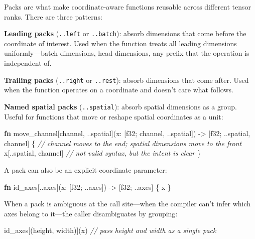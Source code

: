 \documentclass[11pt,]{article}
\newenvironment{Shaded}{}{}
\newcommand{\CommentTok}[1]{\textcolor[rgb]{0.38,0.63,0.69}{\textit{#1}}}
\newcommand{\DataTypeTok}[1]{\textcolor[rgb]{0.56,0.13,0.00}{#1}}
\newcommand{\KeywordTok}[1]{\textcolor[rgb]{0.00,0.44,0.13}{\textbf{#1}}}
\newcommand{\NormalTok}[1]{#1}
\newcommand{\OperatorTok}[1]{\textcolor[rgb]{0.40,0.40,0.40}{#1}}
\begin{document}
Packs are what make coordinate-aware functions reusable across different
tensor ranks. There are three patterns:

\textbf{Leading packs} (\texttt{..left} or \texttt{..batch}): absorb
dimensions that come before the coordinate of interest. Used when the
function treats all leading dimensions uniformly---batch dimensions,
head dimensions, any prefix that the operation is independent of.

\textbf{Trailing packs} (\texttt{..right} or \texttt{..rest}): absorb
dimensions that come after. Used when the function operates on a
coordinate and doesn't care what follows.

\textbf{Named spatial packs} (\texttt{..spatial}): absorb spatial
dimensions as a group. Useful for functions that move or reshape spatial
coordinates as a unit:

\begin{Shaded}
\begin{Highlighting}[]
\KeywordTok{fn}\NormalTok{ move_channel[channel, ..spatial](x: }\OperatorTok{[}\DataTypeTok{f32}\NormalTok{; channel, ..spatial}\OperatorTok{]}\NormalTok{)}
\NormalTok{    -> }\OperatorTok{[}\DataTypeTok{f32}\NormalTok{; ..spatial, channel}\OperatorTok{]}
\OperatorTok{\{}
    \CommentTok{// channel moves to the end; spatial dimensions move to the front}
\NormalTok{    x}\OperatorTok{[}\NormalTok{..spatial, channel}\OperatorTok{]}   \CommentTok{// not valid syntax, but the intent is clear}
\OperatorTok{\}}
\end{Highlighting}
\end{Shaded}

A pack can also be an explicit coordinate parameter:

\begin{Shaded}
\begin{Highlighting}[]
\KeywordTok{fn}\NormalTok{ id_axes[..axes](x: }\OperatorTok{[}\DataTypeTok{f32}\NormalTok{; ..axes}\OperatorTok{]}\NormalTok{) -> }\OperatorTok{[}\DataTypeTok{f32}\NormalTok{; ..axes}\OperatorTok{]} \OperatorTok{\{}
\NormalTok{    x}
\OperatorTok{\}}
\end{Highlighting}
\end{Shaded}

When a pack is ambiguous at the call site---when the compiler can't
infer which axes belong to it---the caller disambiguates by grouping:

\begin{Shaded}
\begin{Highlighting}[]
\NormalTok{id_axes}\OperatorTok{[}\NormalTok{(height, width)}\OperatorTok{]}\NormalTok{(x)   }\CommentTok{// pass height and width as a single pack}
\end{Highlighting}
\end{Shaded}
\end{document}
